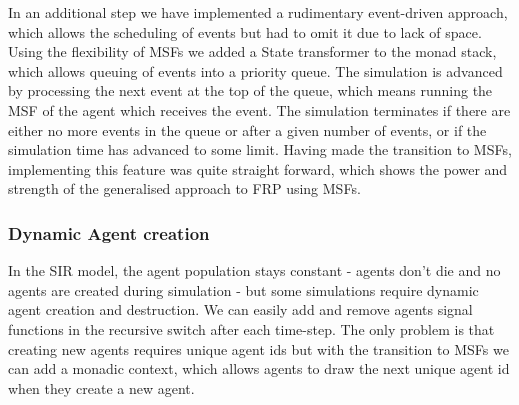 In an additional step we have implemented a rudimentary event-driven approach, which allows the scheduling of events but had to omit it due to lack of space. Using the flexibility of MSFs we added a State transformer to the monad stack, which allows queuing of events into a priority queue. The simulation is advanced by processing the next event at the top of the queue, which means running the MSF of the agent which receives the event. The simulation terminates if there are either no more events in the queue or after a given number of events, or if the simulation time has advanced to some limit. Having made the transition to MSFs, implementing this feature was quite straight forward, which shows the power and strength of the generalised approach to FRP using MSFs.

\subsubsection{Dynamic Agent creation}
In the SIR model, the agent population stays constant - agents don't die and no agents are created during simulation - but some simulations \cite{epstein_growing_1996} require dynamic agent creation and destruction. We can easily add and remove agents signal functions in the recursive switch after each time-step. The only problem is that creating new agents requires unique agent ids but with the transition to MSFs we can add a monadic context, which allows agents to draw the next unique agent id when they create a new agent. 